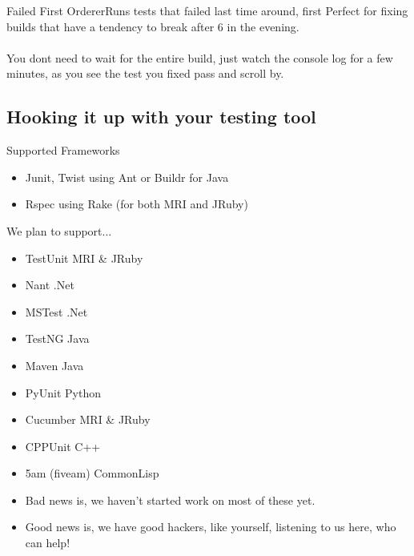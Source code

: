 \documentclass{beamer}
\begin{document}
\begin{frame}{Failed First Orderer}{Runs tests that failed last time around, first}
  Perfect for fixing builds that have a tendency to break after 6 in the evening.\\
  \quad\\
  You dont need to wait for the entire build, just watch the console log for a few minutes, as you see the test you fixed pass and scroll by.
\end{frame}

\subsection{Hooking it up with your testing tool}

\begin{frame}{Supported Frameworks}
  \begin{centering}
    \begin{itemize}
      \item {\color{green}Junit}, {\color{green}Twist} using {\color{red}Ant} or {\color{red}Buildr} for {\color{blue}Java}
        \pause
      \item {\color{green}Rspec} using {\color{red}Rake} (for both {\color{blue}MRI} and {\color{blue}JRuby})
    \end{itemize}
  \end{centering}
\end{frame}

\begin{frame}{We plan to support...}
  \begin{centering}
    \begin{itemize}
    \item {\color{green}TestUnit} {\color{blue}MRI \& JRuby}
    \item {\color{red}Nant} {\color{blue}.Net}
    \item {\color{green}MSTest} {\color{blue}.Net}
    \item {\color{green}TestNG} {\color{blue}Java}
    \item {\color{red}Maven} {\color{blue}Java}
    \item {\color{green}PyUnit} {\color{blue}Python}
    \item {\color{green}Cucumber} {\color{blue}MRI \& JRuby}
    \item {\color{green}CPPUnit} {\color{blue} C++}
    \item {\color{green} 5am (fiveam)} {\color{blue} CommonLisp}
    \end{itemize}
  \end{centering}
  \pause
  \begin{centering}
    \begin{itemize}
      \item Bad news is, we haven't started work on most of these yet.
        \pause
      \item Good news is, we have good hackers, like yourself, listening to us here, who can help!
    \end{itemize}
  \end{centering}
\end{frame}
\end{document}
